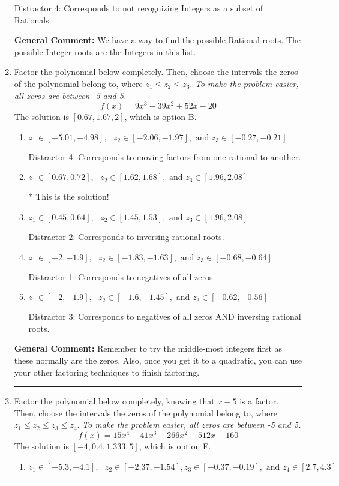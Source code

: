 \documentclass{extbook}[14pt]
\newcommand{\litem}[1]{\item #1

\rule{\textwidth}{0.4pt}}
\begin{document}
\begin{enumerate}
{\begin{enumerate}[label=\Alph*.]
 Distractor 4: Corresponds to not recognizing Integers as a subset of Rationals.
\end{enumerate}

\textbf{General Comment:} We have a way to find the possible Rational roots. The possible Integer roots are the Integers in this list.
}
\litem{
Factor the polynomial below completely. Then, choose the intervals the zeros of the polynomial belong to, where $z_1 \leq z_2 \leq z_3$. \textit{To make the problem easier, all zeros are between -5 and 5.}
\[ f(x) = 9x^{3} -39 x^{2} +52 x -20 \]The solution is \( [0.67, 1.67, 2] \), which is option B.\begin{enumerate}[label=\Alph*.]
\item \( z_1 \in [-5.01, -4.98], \text{   }  z_2 \in [-2.06, -1.97], \text{   and   } z_3 \in [-0.27, -0.21] \)

 Distractor 4: Corresponds to moving factors from one rational to another.
\item \( z_1 \in [0.67, 0.72], \text{   }  z_2 \in [1.62, 1.68], \text{   and   } z_3 \in [1.96, 2.08] \)

* This is the solution!
\item \( z_1 \in [0.45, 0.64], \text{   }  z_2 \in [1.45, 1.53], \text{   and   } z_3 \in [1.96, 2.08] \)

 Distractor 2: Corresponds to inversing rational roots.
\item \( z_1 \in [-2, -1.9], \text{   }  z_2 \in [-1.83, -1.63], \text{   and   } z_3 \in [-0.68, -0.64] \)

 Distractor 1: Corresponds to negatives of all zeros.
\item \( z_1 \in [-2, -1.9], \text{   }  z_2 \in [-1.6, -1.45], \text{   and   } z_3 \in [-0.62, -0.56] \)

 Distractor 3: Corresponds to negatives of all zeros AND inversing rational roots.
\end{enumerate}

\textbf{General Comment:} Remember to try the middle-most integers first as these normally are the zeros. Also, once you get it to a quadratic, you can use your other factoring techniques to finish factoring.
}
\litem{
Factor the polynomial below completely, knowing that $x -5$ is a factor. Then, choose the intervals the zeros of the polynomial belong to, where $z_1 \leq z_2 \leq z_3 \leq z_4$. \textit{To make the problem easier, all zeros are between -5 and 5.}
\[ f(x) = 15x^{4} -41 x^{3} -266 x^{2} +512 x -160 \]The solution is \( [-4, 0.4, 1.333, 5] \), which is option E.\begin{enumerate}[label=\Alph*.]
\item \( z_1 \in [-5.3, -4.1], \text{   }  z_2 \in [-2.37, -1.54], z_3 \in [-0.37, -0.19], \text{   and   } z_4 \in [2.7, 4.3] \)


\end{enumerate}}
\end{enumerate}
\end{document}
